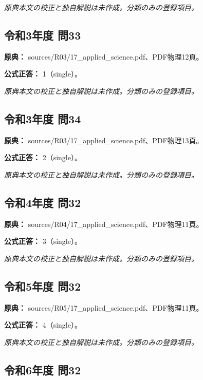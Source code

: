 \par\textit{原典本文の校正と独自解説は未作成。分類のみの登録項目。}

\subsection{令和3年度 問33}
\label{q:r03-reg-applied-33}

\noindent\textbf{原典：} sources/R03/17\_applied\_science.pdf、PDF物理12頁。

\textbf{公式正答：} 1（single）。

\par\textit{原典本文の校正と独自解説は未作成。分類のみの登録項目。}

\subsection{令和3年度 問34}
\label{q:r03-reg-applied-34}

\noindent\textbf{原典：} sources/R03/17\_applied\_science.pdf、PDF物理13頁。

\textbf{公式正答：} 2（single）。

\par\textit{原典本文の校正と独自解説は未作成。分類のみの登録項目。}

\subsection{令和4年度 問32}
\label{q:r04-reg-applied-32}

\noindent\textbf{原典：} sources/R04/17\_applied\_science.pdf、PDF物理11頁。

\textbf{公式正答：} 3（single）。

\par\textit{原典本文の校正と独自解説は未作成。分類のみの登録項目。}

\subsection{令和5年度 問32}
\label{q:r05-reg-applied-32}

\noindent\textbf{原典：} sources/R05/17\_applied\_science.pdf、PDF物理11頁。

\textbf{公式正答：} 4（single）。

\par\textit{原典本文の校正と独自解説は未作成。分類のみの登録項目。}

\subsection{令和6年度 問32}
\label{q:r06-reg-applied-32}

